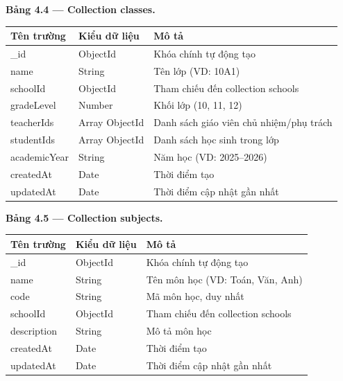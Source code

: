 ﻿\documentclass[../DoAn.tex]{subfiles}
\begin{document}
\vspace{0.3cm}

\noindent\textbf{Bảng 4.4 — Collection classes.}
\begin{center}
\begin{tabular}{|p{3.5cm}|p{2.5cm}|p{7cm}|}
\hline
\textbf{Tên trường} & \textbf{Kiểu dữ liệu} & \textbf{Mô tả} \\ \hline
\_id & ObjectId & Khóa chính tự động tạo \\ \hline
name & String & Tên lớp (VD: 10A1) \\ \hline
schoolId & ObjectId & Tham chiếu đến collection schools \\ \hline
gradeLevel & Number & Khối lớp (10, 11, 12) \\ \hline
teacherIds & Array ObjectId & Danh sách giáo viên chủ nhiệm/phụ trách \\ \hline
studentIds & Array ObjectId & Danh sách học sinh trong lớp \\ \hline
academicYear & String & Năm học (VD: 2025--2026) \\ \hline
createdAt & Date & Thời điểm tạo \\ \hline
updatedAt & Date & Thời điểm cập nhật gần nhất \\ \hline
\end{tabular}
\end{center}

\vspace{0.3cm}

\noindent\textbf{Bảng 4.5 — Collection subjects.}
\begin{center}
\begin{tabular}{|p{3.5cm}|p{2.5cm}|p{7cm}|}
\hline
\textbf{Tên trường} & \textbf{Kiểu dữ liệu} & \textbf{Mô tả} \\ \hline
\_id & ObjectId & Khóa chính tự động tạo \\ \hline
name & String & Tên môn học (VD: Toán, Văn, Anh) \\ \hline
code & String & Mã môn học, duy nhất \\ \hline
schoolId & ObjectId & Tham chiếu đến collection schools \\ \hline
description & String & Mô tả môn học \\ \hline
createdAt & Date & Thời điểm tạo \\ \hline
updatedAt & Date & Thời điểm cập nhật gần nhất \\ \hline
\end{tabular}
\end{center}
\end{document}
